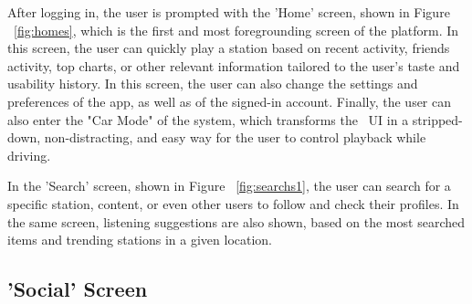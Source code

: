 After logging in, the user is prompted with the 'Home' screen, shown in Figure ~\ref{fig:homes}, which is the first and most foregrounding screen of the platform. In this screen, the user can quickly play a station based on recent activity, friends activity, top charts, or other relevant information tailored to the user's taste and usability history. In this screen, the user can also change the settings and preferences of the app, as well as of the signed-in account. Finally, the user can also enter the "Car Mode" of the system, which transforms the ~\ac{UI} in a stripped-down, non-distracting, and easy way for the user to control playback while driving.

In the 'Search' screen, shown in Figure ~\ref{fig:searchs1}, the user can search for a specific station, content, or even other users to follow and check their profiles. In the same screen, listening suggestions are also shown, based on the most searched items and trending stations in a given location.

\newpage
\subsection{'Social' Screen}

